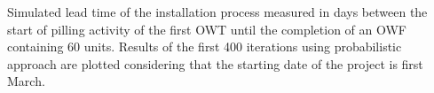 \label{fig:iterations}
Simulated lead time of the installation process measured in days between the start of pilling activity of the first OWT until the completion of an OWF containing 60 units. Results of the first 400 iterations using probabilistic approach are plotted considering that the starting date of the project is first March.